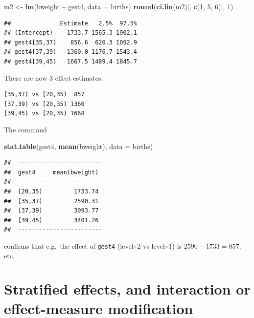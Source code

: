 \documentclass[
]{book}
\newenvironment{Shaded}{\begin{snugshade}}{\end{snugshade}}
\newcommand{\AttributeTok}[1]{\textcolor[rgb]{0.13,0.29,0.53}{#1}}
\newcommand{\DecValTok}[1]{\textcolor[rgb]{0.00,0.00,0.81}{#1}}
\newcommand{\FunctionTok}[1]{\textcolor[rgb]{0.13,0.29,0.53}{\textbf{#1}}}
\newcommand{\NormalTok}[1]{#1}
\newcommand{\OtherTok}[1]{\textcolor[rgb]{0.56,0.35,0.01}{#1}}
\newcommand{\SpecialCharTok}[1]{\textcolor[rgb]{0.81,0.36,0.00}{\textbf{#1}}}
\begin{document}
\begin{Shaded}
\begin{Highlighting}[]
\NormalTok{m2 }\OtherTok{\textless{}{-}} \FunctionTok{lm}\NormalTok{(bweight }\SpecialCharTok{\textasciitilde{}}\NormalTok{ gest4, }\AttributeTok{data =}\NormalTok{ births)}
\FunctionTok{round}\NormalTok{(}\FunctionTok{ci.lin}\NormalTok{(m2)[, }\FunctionTok{c}\NormalTok{(}\DecValTok{1}\NormalTok{, }\DecValTok{5}\NormalTok{, }\DecValTok{6}\NormalTok{)], }\DecValTok{1}\NormalTok{)}
\end{Highlighting}
\end{Shaded}

\begin{verbatim}
##              Estimate   2.5%  97.5%
## (Intercept)    1733.7 1565.3 1902.1
## gest4[35,37)    856.6  620.3 1092.9
## gest4[37,39)   1360.0 1176.7 1543.4
## gest4[39,45)   1667.5 1489.4 1845.7
\end{verbatim}

There are now 3 effect estimates:

\begin{verbatim}
[35,37) vs [20,35)  857
[37,39) vs [20,35) 1360
[39,45) vs [20,35) 1668
\end{verbatim}

The command

\begin{Shaded}
\begin{Highlighting}[]
\FunctionTok{stat.table}\NormalTok{(gest4, }\FunctionTok{mean}\NormalTok{(bweight), }\AttributeTok{data =}\NormalTok{ births)}
\end{Highlighting}
\end{Shaded}

\begin{verbatim}
##  ------------------------ 
##  gest4     mean(bweight)  
##  ------------------------ 
##  [20,35)         1733.74  
##  [35,37)         2590.31  
##  [37,39)         3093.77  
##  [39,45)         3401.26  
##  ------------------------
\end{verbatim}

confirms that e.g.~the effect of \texttt{gest4} (level\textasciitilde2 vs level\textasciitilde1) is
\(2590-1733=857\), etc.

\section{Stratified effects, and interaction or effect-measure modification}\label{stratified-effects-and-interaction-or-effect-measure-modification}
\end{document}
